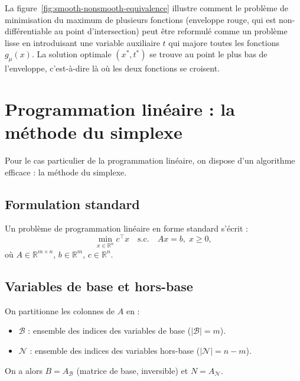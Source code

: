 \begin{figureexplanation}
La figure~\ref{fig:smooth-nonsmooth-equivalence} illustre comment le problème de minimisation du maximum de plusieurs fonctions (enveloppe rouge, qui est non-différentiable au point d'intersection) peut être reformulé comme un problème lisse en introduisant une variable auxiliaire $t$ qui majore toutes les fonctions $g_\mu(x)$. La solution optimale $(x^*, t^*)$ se trouve au point le plus bas de l'enveloppe, c'est-à-dire là où les deux fonctions se croisent.
\end{figureexplanation}

\section{Programmation linéaire : la méthode du simplexe}
\label{sec:simplex-method}

Pour le cas particulier de la programmation linéaire, on dispose d'un algorithme efficace : la méthode du simplexe.

\subsection{Formulation standard}

Un problème de programmation linéaire en forme standard s'écrit :
\begin{equation}
    \min_{x \in \mathbb{R}^n} c^\top x \quad \text{s.c.} \quad Ax = b, \; x \geq 0,
\end{equation}
où $A \in \mathbb{R}^{m \times n}$, $b \in \mathbb{R}^m$, $c \in \mathbb{R}^n$.

\subsection{Variables de base et hors-base}

On partitionne les colonnes de $A$ en :
\begin{itemize}
    \item $\mathcal{B}$ : ensemble des indices des variables de base ($|\mathcal{B}| = m$).
    \item $\mathcal{N}$ : ensemble des indices des variables hors-base ($|\mathcal{N}| = n - m$).
\end{itemize}

On a alors $B = A_{\mathcal{B}}$ (matrice de base, inversible) et $N = A_{\mathcal{N}}$.

